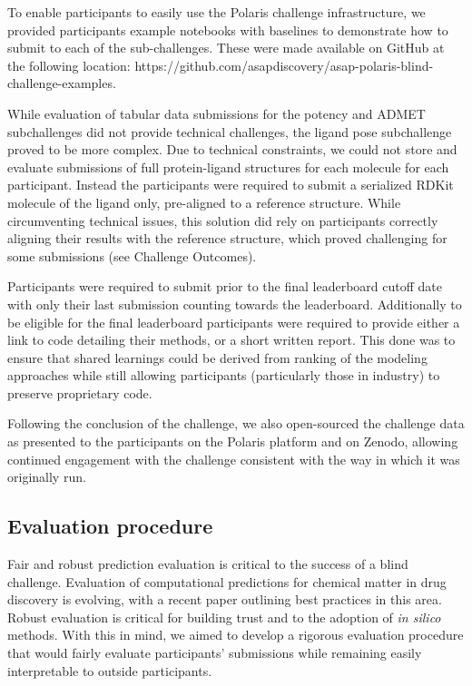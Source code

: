 \documentclass[journal=jcim,manuscript=article]{achemso}
\begin{document}
To enable participants to easily use the Polaris challenge infrastructure, we provided participants example notebooks with baselines to demonstrate how to submit to each of the sub-challenges. These were made available on GitHub at the following location: https://github.com/asapdiscovery/asap-polaris-blind-challenge-examples. 

While evaluation of tabular data submissions for the potency and ADMET subchallenges did not provide technical challenges, the ligand pose subchallenge proved to be more complex. Due to technical constraints, we could not store and evaluate submissions of full protein-ligand structures for each molecule for each participant. Instead the participants were required to submit a serialized RDKit molecule of the ligand only, pre-aligned to a reference structure. While circumventing technical issues, this solution did rely on participants correctly aligning their results with the reference structure, which proved challenging for some submissions (see Challenge Outcomes).

Participants were required to submit prior to the final leaderboard cutoff date with only their last submission counting towards the leaderboard. Additionally to be eligible for the final leaderboard participants were required to provide either a link to code detailing their methods, or a short written report. This done was to ensure that shared learnings could be derived from ranking of the modeling approaches while still allowing participants (particularly those in industry) to preserve proprietary code. 

Following the conclusion of the challenge, we also open-sourced the challenge data as presented to the participants on the Polaris platform and on Zenodo, allowing continued engagement with the challenge consistent with the way in which it was originally run.


\subsection{Evaluation procedure}    

Fair and robust prediction evaluation is critical to the success of a blind challenge.\cite{sampl6_2018} Evaluation of computational predictions for chemical matter in drug discovery is evolving, with a recent paper outlining best practices in this area\cite{ash_practically_2024}.  Robust evaluation is critical for building trust and to the adoption of \textit{in silico} methods. With this in mind, we aimed to develop a rigorous evaluation procedure that would fairly evaluate participants' submissions while remaining easily interpretable to outside participants.
\end{document}
